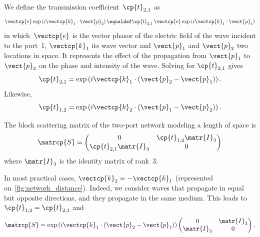 We define the transmission coefficient~$\cp{t}_{2,1}$ as
\begin{equation}
    \vectcp{e} \exp\left(i \vectcp{k}_1 \cdot \vect{p}_2\right)
    \equaldef
    \cp{t}_{2,1}\,
    \vectcp{e} \exp\left(i \vectcp{k}_1 \cdot \vect{p}_1\right)
\end{equation}
in which~$\vectcp{e}$ is the vector phasor of the electric field of the wave incident to the port~1,
$\vectcp{k}_1$ its wave vector
and $\vect{p}_1$ and $\vect{p}_2$ two locations in space.
It represents the effect of the propagation from $\vect{p}_1$ to $\vect{p}_2$ on the phase and intensity of the wave.
Solving for $\cp{t}_{2,1}$ gives
\begin{equation}
    \cp{t}_{2,1} = \exp\left(i \vectcp{k}_1 \cdot (\vect{p}_2 - \vect{p}_1)\right)
    \text{.}
\end{equation}
Likewise,
\begin{equation}
        \cp{t}_{1,2}
        = \exp\left(i \vectcp{k}_2 \cdot (\vect{p}_1 - \vect{p}_2)\right)
        \text{.}
\end{equation}

The block scattering matrix of the two-port network modeling a length of space is
\begin{equation}
    \matrcp{S}
    =
    \begin{pmatrix}
        0                       & \cp{t}_{1,2} \matr{I}_3 \\
        \cp{t}_{2,1} \matr{I}_3 & 0                       \\
    \end{pmatrix}
\end{equation}
where $\matr{I}_3$ is the identity matrix of rank~3.

In most practical cases, $\vectcp{k}_2=-\vectcp{k}_1$ (represented on~\cref{fig:network_distance}).
Indeed, we consider waves that propagate in equal but opposite directions, and they propagate in the same medium.
This leads to $\cp{t}_{1,2}=\cp{t}_{2,1}$ and
\begin{equation}
    \matrcp{S}
    =
    \exp\left(i \vectcp{k}_1 \cdot (\vect{p}_2 - \vect{p}_1)\right)
    \begin{pmatrix}
        0                       & \matr{I}_3 \\
        \matr{I}_3 & 0                       \\
    \end{pmatrix}
    \text{.}
\end{equation}



